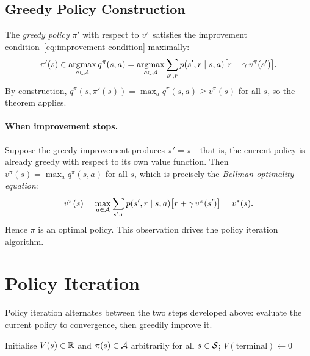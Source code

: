 \subsection*{Greedy Policy Construction}

The \emph{greedy policy} $\pi'$ with respect to $v^\pi$ satisfies the improvement condition~\eqref{eq:improvement-condition} maximally:
\begin{equation}
\label{eq:greedy-policy}
\pi'(s) \in \operatorname*{argmax}_{a \in \mathcal{A}} q^\pi(s,a)
= \operatorname*{argmax}_{a \in \mathcal{A}} \sum_{s',r} p(s',r \mid s,a)\bigl[r + \gamma\,v^\pi(s')\bigr].
\end{equation}
By construction, $q^\pi(s, \pi'(s)) = \max_a q^\pi(s,a) \ge v^\pi(s)$ for all $s$, so the theorem applies.

\paragraph{When improvement stops.}
Suppose the greedy improvement produces $\pi' = \pi$---that is, the current policy is already greedy with respect to its own value function.  Then $v^\pi(s) = \max_a q^\pi(s,a)$ for all $s$, which is precisely the \emph{Bellman optimality equation}:
\[
v^\pi(s) = \max_{a \in \mathcal{A}} \sum_{s',r} p(s',r \mid s,a)\bigl[r + \gamma\, v^\pi(s')\bigr] = v^*(s).
\]
Hence $\pi$ is an optimal policy.  This observation drives the policy iteration algorithm.

\section{Policy Iteration}
\label{sec:policy-iteration}

Policy iteration alternates between the two steps developed above: evaluate the current policy to convergence, then greedily improve it.

\begin{algorithm}[ht]
\caption{Policy Iteration}
\label{alg:policy-iteration}
Initialise $V(s) \in \mathbb{R}$ and $\pi(s) \in \mathcal{A}$ arbitrarily for all $s \in \mathcal{S}$; $V(\text{terminal}) \leftarrow 0$\;
\end{algorithm}

